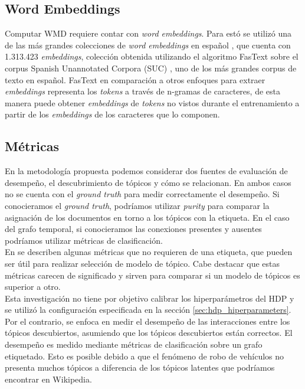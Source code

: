 \subsection{Word Embeddings}

Computar WMD requiere contar con \textit{word embeddings}. Para estó se utilizó una de las más grandes colecciones de \textit{word embeddings} en español \citep{fastextSUC}, que cuenta con 1.313.423 \textit{embeddings}, colección obtenida utilizando el algoritmo FasText \citep{bojanowski2017enriching} sobre el corpus Spanish Unannotated Corpora (SUC) \citep{josecanneteSUC}, uno de los más grandes corpus de texto en español. FasText en comparación a otros enfoques para extraer \textit{embeddings} representa los \textit{tokens} a través de n-gramas de caracteres, de esta manera puede obtener \textit{embeddings} de \textit{tokens} no vistos durante el entrenamiento a partir de los \textit{embeddings} de los caracteres que lo componen.

\subsection{Métricas}

En la metodología propuesta podemos considerar dos fuentes de evaluación de desempeño, el descubrimiento de tópicos y cómo se relacionan. En ambos casos no se cuenta con el \textit{ground truth} para medir correctamente el desempeño. Si conocieramos el \textit{ground truth}, podríamos utilizar \textit{purity} \citep{manning2008introduction} para comparar la asignación de los documentos en torno a los tópicos con la etiqueta. En el caso del grafo temporal, si conocieramos las conexiones presentes y ausentes podríamos utilizar métricas de clasificación.\\

En \citep{blei2003latent,griffiths2004finding,cao2009density,arun2010finding,deveaud2014accurate,zhang2017lda} se describen algunas métricas que no requieren de una etiqueta, que pueden ser útil para realizar selección de modelo de tópico. Cabe destacar que estas métricas carecen de significado y sirven para comparar si un modelo de tópicos es superior a otro.\\

Esta investigación no tiene por objetivo calibrar los hiperparámetros del HDP y se utilizó la configuración especificada en la sección \ref{sec:hdp_hiperparameters}. Por el contrario, se enfoca en medir el desempeño de las interacciones entre los tópicos descubiertos, asumiendo que los tópicos descubiertos están correctos. El desempeño es medido mediante métricas de clasificación sobre un grafo etiquetado. Esto es posible  debido a que el fenómeno de robo de vehículos no presenta muchos tópicos a diferencia de los tópicos latentes que podríamos encontrar en Wikipedia.\\

